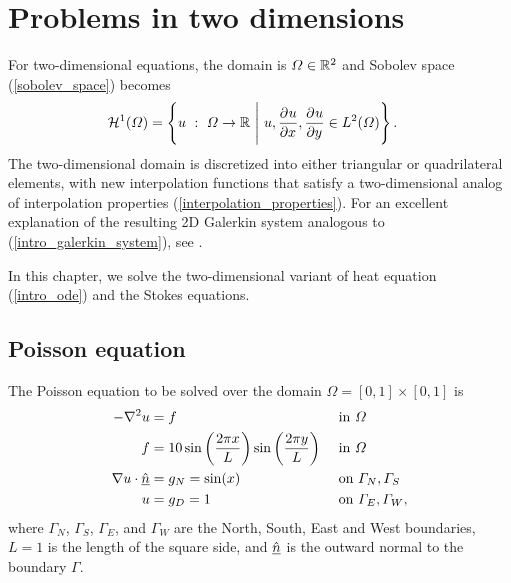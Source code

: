 
\chapter{Problems in two dimensions}

For two-dimensional equations, the domain is $\varOmega \in \mathbb{R}^2$ and Sobolev space (\ref{sobolev_space}) becomes
\begin{align}
  \label{2d_sobolev_space}
  \mathcal{H}^1(\Omega) &= \left\{ u\ :\ \Omega \rightarrow \R\ \Bigg|\ u, \parder{u}{x}, \parder{u}{y} \in L^2(\Omega) \right\}.
\end{align}
The two-dimensional domain is discretized into either triangular or quadrilateral elements, with new interpolation functions that satisfy a two-dimensional analog of interpolation properties (\ref{interpolation_properties}).  For an excellent explanation of the resulting 2D Galerkin system analogous to (\ref{intro_galerkin_system}), see \citet{elman_2005}.

In this chapter, we solve the two-dimensional variant of heat equation (\ref{intro_ode}) and the Stokes equations.


\section{Poisson equation}

The Poisson equation to be solved over the domain $\Omega = [0,1] \times [0,1]$ is
\begin{align}
  \label{2d_poisson_start}
  -\nabla^2 u &= f &&\text{ in } \varOmega \\
  f &= 10 \sin\left(\frac{2\pi x}{L}\right) \sin\left(\frac{2\pi y}{L}\right) &&\text{ in } \varOmega \\
  \nabla u \cdot \underline{\hat{n}} &= g_N = \sin(x) &&\text{ on } \varGamma_N, \varGamma_S \\
  \label{2d_poisson_end}
  u &= g_D = 1 &&\text{ on } \varGamma_E, \varGamma_W,
\end{align}
where $\Gamma_N$, $\Gamma_S$, $\Gamma_E$, and $\Gamma_W$ are the North, South, East and West boundaries, $L=1$ is the length of the square side, and $\underline{\hat{n}}$ is the outward normal to the boundary $\Gamma$.

